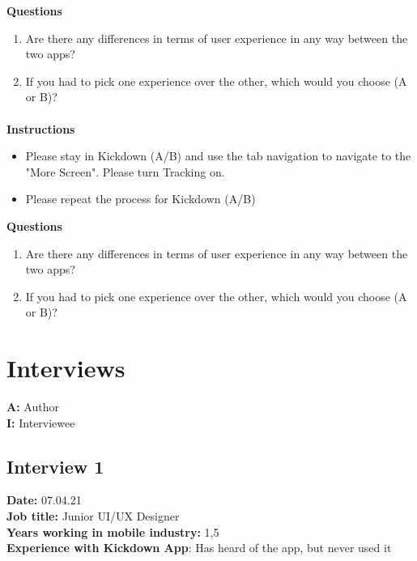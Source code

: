 \textbf{Questions}
\begin{enumerate}
    \item Are there any differences in terms of user experience in any way between the two apps?
    \item If you had to pick one experience over the other, which would you choose (A or B)?
\end{enumerate}

\paragraph*{    }\hfill \break
\textbf{Instructions}
\begin{itemize}
    \item Please stay in Kickdown (A/B) and use the tab navigation to navigate to the "More Screen". Please turn Tracking on.
    \item Please repeat the process for Kickdown (A/B)
\end{itemize}

\textbf{Questions}
\begin{enumerate}
    \item Are there any differences in terms of user experience in any way between the two apps?
    \item If you had to pick one experience over the other, which would you choose (A or B)?
\end{enumerate}

\section{Interviews}

\textbf{A:} Author\\
\textbf{I:} Interviewee

\subsection{Interview 1}
\textbf{Date:} 07.04.21\\
\textbf{Job title:} Junior UI/UX Designer\\
\textbf{Years working in mobile industry:} 1,5\\
\textbf{Experience with Kickdown App}: Has heard of the app, but never used it\\

